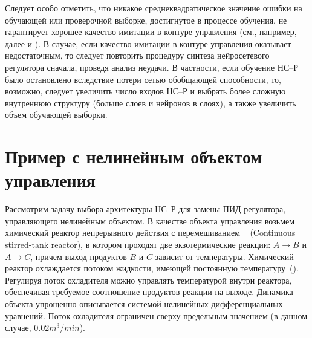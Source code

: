 Следует особо отметить, что никакое среднеквадратическое значение
ошибки на обучающей или проверочной выборке, достигнутое в процессе
обучения, не гарантирует хорошее качество имитации в контуре
управления (см., например, далее
 и
).  В случае, если качество
имитации в контуре управления оказывает недостаточным, то следует
повторить процедуру синтеза нейросетевого регулятора сначала, проведя
анализ неудачи.  В частности, если обучение НС--Р было остановлено
вследствие потери сетью обобщающей способности, то, возможно, следует
увеличить число входов НС--Р и выбрать более сложную внутреннюю
структуру (больше слоев и нейронов в слоях), а также увеличить объем
обучающей выборки.





\section{Пример с нелинейным объектом управления}\label{nonlinear_nnc}

Рассмотрим задачу выбора архитектуры НС--Р для замены ПИД регулятора,
управляющего нелинейным объектом.  В качестве объекта управления
возьмем химический реактор непрерывного действия с перемешиванием
~\cite{wiki-cstr} (Continuous stirred-tank reactor), в котором
проходят две экзотермические реакции: $A\rightarrow B$ и $A\rightarrow
C$, причем выход продуктов $B$ и $C$ зависит от температуры.
Химический реактор охлаждается потоком жидкости, имеющей постоянную
температуру~().  Регулируя поток охладителя
можно управлять температурой внутри реактора, обеспечивая требуемое
соотношение продуктов реакции на выходе.  Динамика объекта упрощенно
описывается системой нелинейных дифференциальных уравнений.  Поток
охладителя ограничен сверху предельным значением (в данном случае,
$0.02 m^3/min$).

